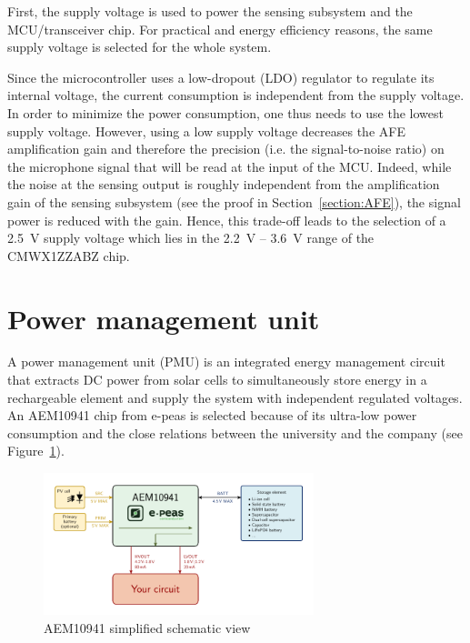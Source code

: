 \documentclass{EPL-master-thesis-covers-EN}
\newcommand{\te}[1]{\textrm{#1}}
\begin{document}
First, the supply voltage is used to power the sensing subsystem and the MCU/transceiver chip. For practical and energy efficiency reasons, the same supply voltage is selected for the whole system.

Since the microcontroller uses a low-dropout (LDO) regulator to regulate its internal voltage, the current consumption is independent from the supply voltage. In order to minimize the power consumption, one thus needs to use the lowest supply voltage. However, using a low supply voltage decreases the AFE amplification gain and therefore the precision (i.e. the signal-to-noise ratio) on the microphone signal that will be read at the input of the MCU. Indeed, while the noise at the sensing output is roughly independent from the amplification gain of the sensing subsystem (see the proof in Section~\ref{section:AFE}), the signal power is reduced with the gain. Hence, this trade-off leads to the selection of a \SI{2.5}{V} supply voltage which lies in the \SI{2.2}{V} -- \SI{3.6}{V} range of the CMWX1ZZABZ chip.



\section{Power management unit}
\label{section:PMU}

A power management unit (PMU) is an integrated energy management circuit that extracts DC power from solar cells to simultaneously store energy in a rechargeable element and supply the system with independent regulated voltages. An AEM10941 chip from e-peas is selected because of its ultra-low power consumption and the close relations between the university and the company (see Figure~\ref{fig:AEM10941}).

\begin{figure}[H]
    \centering
    \includegraphics[width=0.7\textwidth]{AEM10941.pdf}
    \caption[AEM10941 simplified schematic view]{AEM10941 simplified schematic view~\cite{AEM10941}}
    \label{fig:AEM10941}
\end{figure}
\end{document}
